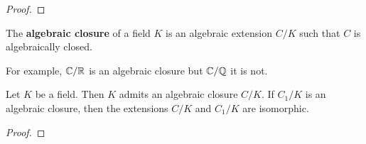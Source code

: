 \begin{proof}
\end{proof}

\begin{definition}
	The \textbf{algebraic closure} of a field $K$ is an algebraic extension $C/K$ 
	such that $C$ is algebraically closed. 
\end{definition}

For example, $\mathbb{C}/\mathbb{R}$ is an algebraic closure but $\mathbb{C}/\mathbb{Q}$ it is not. 


\begin{theorem}[Artin]
	Let $K$ be a field. Then $K$ admits an algebraic closure $C/K$. If $C_1/K$ 
	is an algebraic closure, then the extensions $C/K$ and $C_1/K$ are isomorphic. 
\end{theorem}

\begin{proof}
\end{proof}
